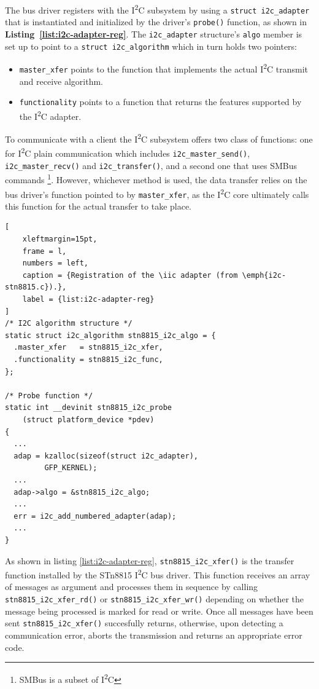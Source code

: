 \documentclass[a4paper,10pt]{article}
\newenvironment{packeditems}{
\begin{itemize}
  \setlength{\itemsep}{3pt}
  \setlength{\parskip}{0pt}
  \setlength{\parsep}{0pt}
}{\end{itemize}}
\newcommand{\iic}{I\textsuperscript{2}C }
\newcommand{\keyword}[1]{\texttt{#1}}
\newcommand{\refl}[1]{\textbf{Listing~\ref{#1}}}
\begin{document}
\begin{multicols}{2}
The bus driver registers with the \iic subsystem by using a
\keyword{struct i2c\_adapter} that is instantiated and initialized by the
driver's \keyword{probe()} function, as shown in \refl{list:i2c-adapter-reg}.
The \keyword{i2c\_adapter} structure's \keyword{algo} member is set up to
point to a \keyword{struct i2c\_algorithm} which in turn holds two pointers:
\begin{packeditems}
	\item \keyword{master\_xfer} points to the function that implements the
		actual \iic transmit and receive algorithm.
	\item \keyword{functionality} points to a function that returns the
		features supported by the \iic adapter.
\end{packeditems}

To communicate with a client the \iic subsystem offers two class of functions:
one for \iic plain communication which includes \keyword{i2c\_master\_send()},
\keyword{i2c\_master\_recv()} and \keyword{i2c\_transfer()}, and a second one
that uses SMBus commands
\footnote{SMBus is a subset of \iic}.
However, whichever method is used, the data transfer relies on the bus driver's
function pointed to by \keyword{master\_xfer}, as the \iic core ultimately calls
this function for the actual transfer to take place.

\begin{lstlisting}[
	xleftmargin=15pt,
	frame = l,
	numbers = left,
	caption = {Registration of the \iic adapter (from \emph{i2c-stn8815.c}).},
	label = {list:i2c-adapter-reg}
]
/* I2C algorithm structure */
static struct i2c_algorithm stn8815_i2c_algo = {
  .master_xfer   = stn8815_i2c_xfer,
  .functionality = stn8815_i2c_func,
};

/* Probe function */
static int __devinit stn8815_i2c_probe
	(struct platform_device *pdev)
{
  ...
  adap = kzalloc(sizeof(struct i2c_adapter),
         GFP_KERNEL);
  ...
  adap->algo = &stn8815_i2c_algo;
  ...
  err = i2c_add_numbered_adapter(adap);
  ...
}
\end{lstlisting}

As shown in listing \ref{list:i2c-adapter-reg}, \keyword{stn8815\_i2c\_xfer()}
is the transfer function installed by the STn8815 \iic bus driver.
This function receives an array of messages as argument and processes them in
sequence by calling \keyword{stn8815\_i2c\_xfer\_rd()} or
\keyword{stn8815\_i2c\_xfer\_wr()} depending on whether the message being
processed is marked for read or write.
Once all messages have been sent \keyword{stn8815\_i2c\_xfer()} succesfully
returns, otherwise, upon detecting a communication error, aborts the transmission
and returns an appropriate error code.


\end{multicols}
\end{document}
